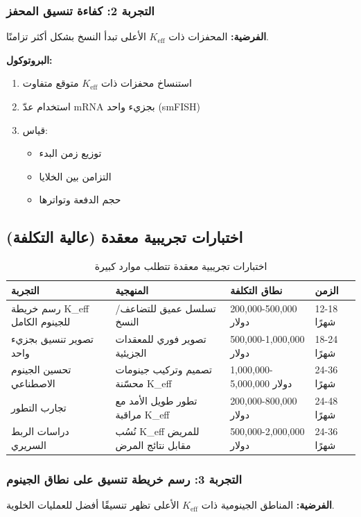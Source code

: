 \documentclass[11pt,a4paper]{article}
\begin{document}
	\subsubsection{التجربة 2: كفاءة تنسيق المحفز}
	\textbf{الفرضية:} المحفزات ذات $K_{\text{eff}}$ الأعلى تبدأ النسخ بشكل أكثر تزامنًا.
	
	\textbf{البروتوكول:}
	\begin{enumerate}
		\item استنساخ محفزات ذات $K_{\text{eff}}$ متوقع متفاوت
		\item استخدام عدّ mRNA بجزيء واحد (smFISH)
		\item قياس:
		\begin{itemize}
			\item توزيع زمن البدء
			\item التزامن بين الخلايا
			\item حجم الدفعة وتواترها
		\end{itemize}
	\end{enumerate}
	
	\subsection{اختبارات تجريبية معقدة (عالية التكلفة)}
	
	\begin{table}[H]
		\centering
		\caption{اختبارات تجريبية معقدة تتطلب موارد كبيرة}
		\begin{tabular}{p{4cm}p{5cm}p{3cm}p{2cm}}
			\toprule
			\textbf{التجربة} & \textbf{المنهجية} & \textbf{نطاق التكلفة} & \textbf{الزمن} \\
			\midrule
			رسم خريطة K\_eff للجينوم الكامل & تسلسل عميق للتضاعف/النسخ & 200,000-500,000 دولار & 12-18 شهرًا \\
			تصوير تنسيق بجزيء واحد & تصوير فوري للمعقدات الجزيئية & 500,000-1,000,000 دولار & 18-24 شهرًا \\
			تحسين الجينوم الاصطناعي & تصميم وتركيب جينومات محسّنة K\_eff & 1,000,000-5,000,000 دولار & 24-36 شهرًا \\
			تجارب التطور & تطور طويل الأمد مع مراقبة K\_eff & 200,000-800,000 دولار & 24-48 شهرًا \\
			دراسات الربط السريري & نُسُب K\_eff للمريض مقابل نتائج المرض & 500,000-2,000,000 دولار & 24-36 شهرًا \\
			\bottomrule
		\end{tabular}
	\end{table}
	
	\subsubsection{التجربة 3: رسم خريطة تنسيق على نطاق الجينوم}
	\textbf{الفرضية:} المناطق الجينومية ذات $K_{\text{eff}}$ الأعلى تظهر تنسيقًا أفضل للعمليات الخلوية.
	
\end{document}
